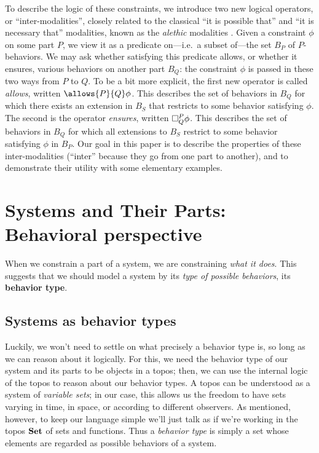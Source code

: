 To describe the logic of these constraints, we introduce two new logical operators, or ``inter-modalities'', closely related to the classical ``it is possible that'' and ``it is necessary that'' modalities, known as the \emph{alethic} modalities \cite{kripke1963semantical}. Given a constraint $\phi$ on some part $P$, we view it as a predicate on---i.e.\ a subset of---the set $B_P$ of $P$-behaviors. We may ask whether satisfying this predicate allows, or whether it ensures, various behaviors on another part $B_Q$: the constraint $\phi$ is passed in these two ways  from $P$ to $Q$.  To be a bit more explicit, the first new operator is called \emph{allows}, written $\allows{P}{Q}\phi$. This describes the set of behaviors in $B_Q$ for which there exists an extension in $B_S$ that restricts to some behavior satisfying $\phi$. The second is the operator \emph{ensures}, written $\ensure{P}{Q}\phi$. This describes the set of behaviors in $B_Q$ for which all extensions to $B_S$ restrict to some behavior satisfying $\phi$ in $B_P$. Our goal in this paper is to describe the properties of these inter-modalities (``inter'' because they go from one part to another), and to demonstrate their utility with some elementary examples.

\section{Systems and Their Parts: Behavioral perspective}

When we constrain a part of a system, we are constraining \emph{what it does}. This suggests that we should model a system by its \emph{type of possible behaviors}, its \textbf{behavior type}.

\subsection{Systems as behavior types}

Luckily, we won't need to settle on what precisely a behavior type is, so long as we can reason about it logically. For this, we need the behavior type of our system and its parts to be objects in a topos; then, we can use the internal logic of the topos to reason about our behavior types. A topos can be understood as a system of \emph{variable sets}; in our case, this allows us the freedom to have sets varying in time, in space, or according to different observers. As mentioned, however, to keep our language simple we'll just talk as if we're working in the topos $\Set$ of sets and functions. Thus a \emph{behavior type} is simply a set whose elements are regarded as possible behaviors of a system.


